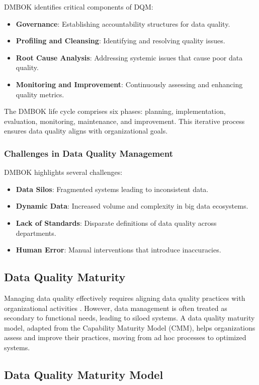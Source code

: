 \documentclass[conference]{IEEEtran}
\begin{document}
DMBOK identifies critical components of DQM:
\begin{itemize}
    \item \textbf{Governance}: Establishing accountability structures for data quality.
    \item \textbf{Profiling and Cleansing}: Identifying and resolving quality issues.
    \item \textbf{Root Cause Analysis}: Addressing systemic issues that cause poor data quality.
    \item \textbf{Monitoring and Improvement}: Continuously assessing and enhancing quality metrics.
\end{itemize}

The DMBOK life cycle comprises six phases: planning, implementation, evaluation, monitoring, maintenance, and improvement. This iterative process ensures data quality aligns with organizational goals.

\subsubsection{Challenges in Data Quality Management}
DMBOK highlights several challenges:
\begin{itemize}
    \item \textbf{Data Silos}: Fragmented systems leading to inconsistent data.
    \item \textbf{Dynamic Data}: Increased volume and complexity in big data ecosystems.
    \item \textbf{Lack of Standards}: Disparate definitions of data quality across departments.
    \item \textbf{Human Error}: Manual interventions that introduce inaccuracies.
\end{itemize}


\subsection{Data Quality Maturity}

Managing data quality effectively requires aligning data quality practices with organizational activities \cite{loshin_dqi}. However, data management is often treated as secondary to functional needs, leading to siloed systems. A data quality maturity model, adapted from the Capability Maturity Model (CMM), helps organizations assess and improve their practices, moving from ad hoc processes to optimized systems.


\subsection{Data Quality Maturity Model}
\end{document}
